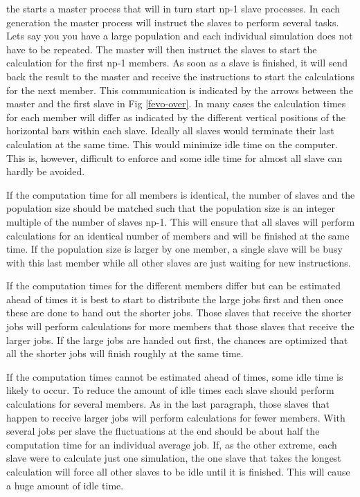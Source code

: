 the \Suite starts a master process that will in turn start np-1 slave 
processes. In each generation the master process will instruct the slaves
to perform several tasks. Lets say you you have a large population and
each individual simulation does not have to be repeated. The master will 
then instruct the slaves to start the calculation for the first np-1
members. As soon as a slave is finished, it will send back the result to 
the master and receive the instructions to start the calculations for
the next member. This communication is indicated by the arrows between the
 master and the first slave in Fig \ref{fevo-over}. In many cases the 
calculation times for each member will differ as indicated by the 
different vertical positions of the horizontal bars within each slave.
Ideally all slaves would terminate their last calculation at the same time. 
This would minimize idle time on the computer. This is, however,
difficult to enforce and some idle time for almost all slave can hardly be
avoided. 

If the computation time for all members is identical, the number of slaves
and the population size should be matched such that the population size is
an integer multiple of the number of slaves np-1. This will ensure that
all slaves will perform calculations for an identical number of members and
will be finished at the same time. If the population size is larger by
one member, a single slave will be busy with this last member while all
other slaves are just waiting for new instructions.

If the computation times for the different members differ but can be estimated 
ahead of times it is best to start to distribute the large jobs first and then
once these are done to hand out the shorter jobs. Those slaves that receive
the shorter jobs will perform calculations for more members that those 
slaves that receive the larger jobs. If the large jobs are handed out first, 
the chances are optimized that all the shorter jobs will finish roughly at the 
same time.

If the computation times cannot be estimated ahead of times, some idle time
is likely to occur. To reduce the amount of idle times each slave should perform
calculations for several members. As in the last paragraph, those slaves that
happen to receive larger jobs will perform calculations for fewer members. 
With several jobs per slave the fluctuations at the end should be about
half the computation time for an individual average job. 
If, as the other extreme, each slave were to 
calculate just one simulation, the one slave that takes the longest
calculation will force all other slaves to be idle until it is finished.
This will cause a huge amount of idle time.

